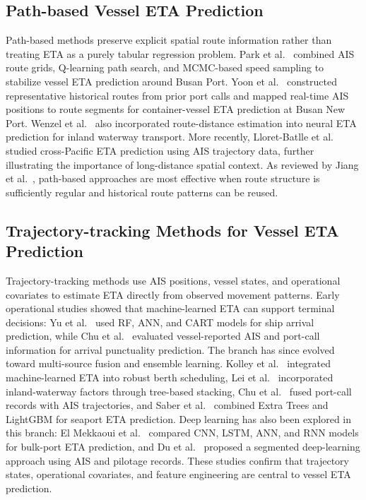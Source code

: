 \documentclass[sigconf,anonymous]{acmart}%
\begin{document}
\subsection{Path-based Vessel ETA Prediction}
Path-based methods preserve explicit spatial route information rather than treating ETA as a purely tabular regression problem.
Park et al.~\cite{parkVesselEstimatedTime2021} combined AIS route grids, Q-learning path search, and MCMC-based speed sampling to stabilize vessel ETA prediction around Busan Port.
Yoon et al.~\cite{yoonEnhancingContainerVessel2023} constructed representative historical routes from prior port calls and mapped real-time AIS positions to route segments for container-vessel ETA prediction at Busan New Port.
Wenzel et al.~\cite{wenzelNeuralNetworkApproach2023} also incorporated route-distance estimation into neural ETA prediction for inland waterway transport.
More recently, Lloret-Batlle et al.~\cite{lloretbatlle2025} studied cross-Pacific ETA prediction using AIS trajectory data, further illustrating the importance of long-distance spatial context.
As reviewed by Jiang et al.~\cite{jiangPredictionVesselArrival2025}, path-based approaches are most effective when route structure is sufficiently regular and historical route patterns can be reused.

\subsection{Trajectory-tracking Methods for Vessel ETA Prediction}
Trajectory-tracking methods use AIS positions, vessel states, and operational covariates to estimate ETA directly from observed movement patterns.
Early operational studies showed that machine-learned ETA can support terminal decisions: Yu et al.~\cite{yuShipArrivalPrediction2018} used RF, ANN, and CART models for ship arrival prediction, while Chu et al.~\cite{chuEvaluationPredictionPunctuality2023} evaluated vessel-reported AIS and port-call information for arrival punctuality prediction.
The branch has since evolved toward multi-source fusion and ensemble learning.
Kolley et al.~\cite{kolleyRobustBerthScheduling2022} integrated machine-learned ETA into robust berth scheduling, Lei et al.~\cite{leiPredictingVesselArrival2024} incorporated inland-waterway factors through tree-based stacking, Chu et al.~\cite{chuVesselArrivalTime2025} fused port-call records with AIS trajectories, and Saber et al.~\cite{saberHighaccuracyPredictionVessels2025} combined Extra Trees and LightGBM for seaport ETA prediction.
Deep learning has also been explored in this branch: El Mekkaoui et al.~\cite{elmekkaouiDeepLearningModels2022} compared CNN, LSTM, ANN, and RNN models for bulk-port ETA prediction, and Du et al.~\cite{duSegmentedETAPrediction2025} proposed a segmented deep-learning approach using AIS and pilotage records.
These studies confirm that trajectory states, operational covariates, and feature engineering are central to vessel ETA prediction.
\end{document}
